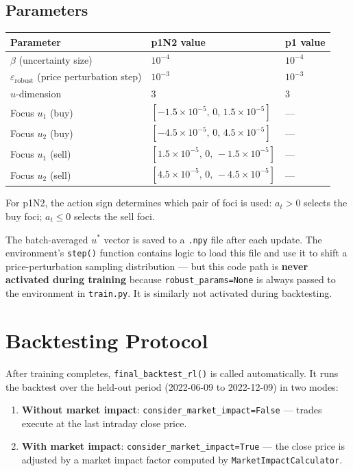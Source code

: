 \documentclass[11pt,a4paper]{article}
\begin{document}
\subsection{Parameters}

\begin{center}
\begin{tabular}{lll}
\toprule
Parameter & p1N2 value & p1 value \\
\midrule
$\beta$ (uncertainty size) & $10^{-4}$ & $10^{-4}$ \\
$\varepsilon_{\text{robust}}$ (price perturbation step) & $10^{-3}$ & $10^{-3}$ \\
$u$-dimension & 3 & 3 \\
Focus $u_1$ (buy) & $[-1.5\times10^{-5},\,0,\,1.5\times10^{-5}]$ & --- \\
Focus $u_2$ (buy) & $[-4.5\times10^{-5},\,0,\,4.5\times10^{-5}]$ & --- \\
Focus $u_1$ (sell) & $[1.5\times10^{-5},\,0,\,-1.5\times10^{-5}]$ & --- \\
Focus $u_2$ (sell) & $[4.5\times10^{-5},\,0,\,-4.5\times10^{-5}]$ & --- \\
\bottomrule
\end{tabular}
\end{center}

For p1N2, the action sign determines which pair of foci is used: $a_t > 0$ selects the buy foci; $a_t \leq 0$ selects the sell foci.

The batch-averaged $u^*$ vector is saved to a \texttt{.npy} file after each update. The environment's \texttt{step()} function contains logic to load this file and use it to shift a price-perturbation sampling distribution --- but this code path is \textbf{never activated during training} because \texttt{robust\_params=None} is always passed to the environment in \texttt{train.py}. It is similarly not activated during backtesting.

\section{Backtesting Protocol}

After training completes, \texttt{final\_backtest\_rl()} is called automatically. It runs the backtest over the held-out period (2022-06-09 to 2022-12-09) in two modes:

\begin{enumerate}
  \item \textbf{Without market impact}: \texttt{consider\_market\_impact=False} --- trades execute at the last intraday close price.
  \item \textbf{With market impact}: \texttt{consider\_market\_impact=True} --- the close price is adjusted by a market impact factor computed by \texttt{MarketImpactCalculator}.
\end{enumerate}
\end{document}
